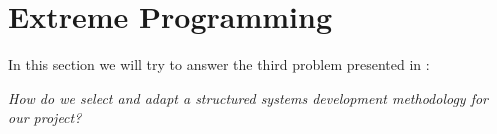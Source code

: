 \section{Extreme Programming}
In this section we will try to answer the third problem presented in :
\begin{center}
	\textit{How do we select and adapt a structured systems development methodology for our project?}
\end{center}


